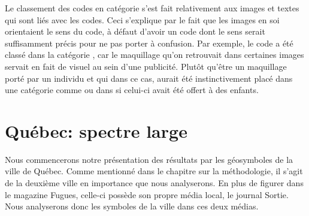 Le classement des codes en catégorie s'est fait relativement aux images et textes qui sont liés avec les codes. 
Ceci s'explique par le fait que les images en soi orientaient le sens du code, à défaut d'avoir un code dont le sens serait suffisamment précis pour ne pas porter à confusion. 
Par exemple, le code  a été classé dans la catégorie , car le maquillage qu'on retrouvait dans certaines images servait en fait de visuel au sein d'une publicité. 
Plutôt qu'être un maquillage porté par un individu et qui dans ce cas, aurait été instinctivement placé dans une catégorie comme  ou dans  si celui-ci avait été offert à des enfants.

\section{Québec: spectre large}
\label{sec:qu_bec_spectre_large}
Nous commencerons notre présentation des résultats par les géosymboles de la ville de Québec. 
Comme mentionné dans le chapitre sur la méthodologie, il s'agit de la deuxième ville en importance que nous analyserons. 
En plus de figurer dans le magazine Fugues, celle-ci possède son propre média local, le journal Sortie. 
Nous analyserons donc les symboles de la ville dans ces deux médias.

